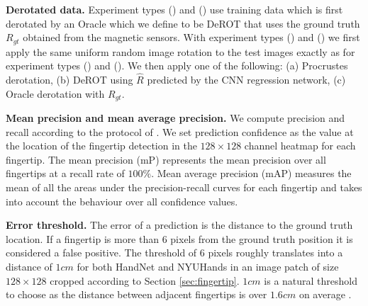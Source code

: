 \documentclass{bmvc2k}
\newcommand{\RNum}[1]{\uppercase\expandafter{\romannumeral #1\relax}}
\begin{document}
\textbf{Derotated data.} Experiment types (\RNum{3}) and (\RNum{4}) use training data which is first derotated by an Oracle which we define to be DeROT that uses the ground truth $R_{gt}$ obtained from the magnetic sensors. With experiment types (\RNum{2}) and (\RNum{4}) we first apply the same uniform random image rotation to the test images exactly as for experiment types (\RNum{1}) and (\RNum{2}). We then apply one of the following: (a) Procrustes derotation, (b) DeROT using $\hat{R}$ predicted by the CNN regression network, (c) Oracle derotation with $R_{gt}$. 

\textbf{Mean precision and mean average precision.} We compute precision and recall according to the protocol of \cite{voc11}. We set prediction confidence as the value at the location of the fingertip detection in the $128\times 128$ channel heatmap for each fingertip. The mean precision (mP) represents the mean precision over all fingertips at a recall rate of $100\%$. Mean average precision (mAP) measures the mean of all the areas under the precision-recall curves for each fingertip and takes into account the behaviour over all confidence values. 

\textbf{Error threshold.} The error of a prediction is the distance to the ground truth location. If a fingertip is more than 6 pixels from the ground truth position it is considered a false positive. The threshold of 6 pixels roughly translates into a distance of $1cm$ for both HandNet and NYUHands in an image patch of size $128\times 128$ cropped according to Section \ref{sec:fingertip}. $1cm$ is a natural threshold to choose as the distance between adjacent fingertips is over $1.6cm$ on average \cite{dandekar2003}. 

\end{document}
